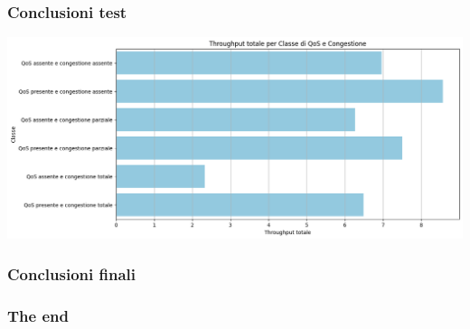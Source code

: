 \documentclass{beamer}
\begin{document}
\begin{frame}
    \frametitle{Conclusioni test}
    \includegraphics[width=\textwidth]{throughput_bar.png}
\end{frame}

\begin{frame}
    \frametitle{Conclusioni finali}
\end{frame}

\begin{frame}
    \frametitle{The end}
\end{frame}
\end{document}
